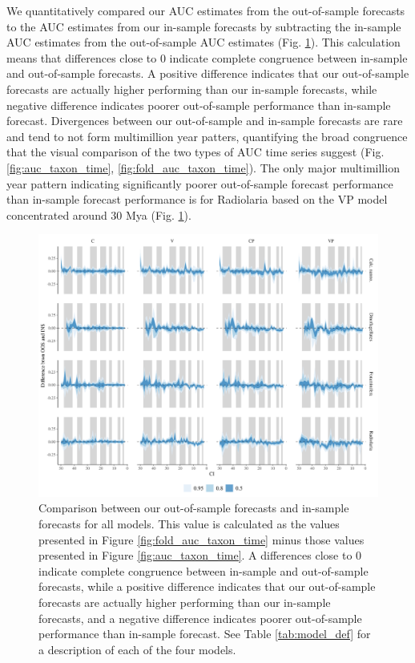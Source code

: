\documentclass[12pt,letterpaper]{article}
\begin{document}
\begin{refsection}
We quantitatively compared our AUC estimates from the out-of-sample forecasts to the AUC estimates from our in-sample forecasts by subtracting the in-sample AUC estimates from the out-of-sample AUC estimates (Fig. \ref{fig:oos_ins_diff}). This calculation means that differences close to 0 indicate complete congruence between in-sample and out-of-sample forecasts. A positive difference indicates that our out-of-sample forecasts are actually higher performing than our in-sample forecasts, while negative difference indicates poorer out-of-sample performance than in-sample forecast. Divergences between our out-of-sample and in-sample forecasts are rare and tend to not form multimillion year patters, quantifying the broad congruence that the visual comparison of the two types of AUC time series suggest (Fig. \ref{fig:auc_taxon_time}, \ref{fig:fold_auc_taxon_time}). The only major multimillion year pattern indicating significantly poorer out-of-sample forecast performance than in-sample forecast performance is for Radiolaria based on the VP model concentrated around 30 Mya (Fig. \ref{fig:oos_ins_diff}).

\begin{figure}[ht]
  \centering
  \includegraphics[width=\textwidth,height=0.5\textheight,keepaspectratio=true]{../results/figure/auc_diff}
  \caption{Comparison between our out-of-sample forecasts and in-sample forecasts for all models. This value is calculated as the values presented in Figure \ref{fig:fold_auc_taxon_time} minus those values presented in Figure \ref{fig:auc_taxon_time}. A differences close to 0 indicate complete congruence between in-sample and out-of-sample forecasts, while a positive difference indicates that our out-of-sample forecasts are actually higher performing than our in-sample forecasts, and a negative difference indicates poorer out-of-sample performance than in-sample forecast. See Table \ref{tab:model_def} for a description of each of the four models.}
  \label{fig:oos_ins_diff}
\end{figure}




\end{refsection}
\end{document}
